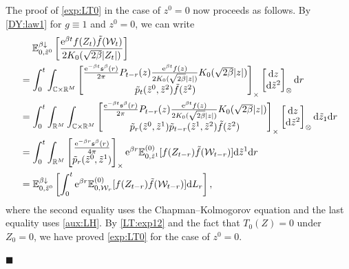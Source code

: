 \documentclass[12pt, twoside]{article}
\numberwithin{figure}{section}
\newcommand{\e}{{\mathrm e}}
\newcommand{\1}{\mathds 1}
\newcommand{\da}{{\downarrow}}
\newcommand{\E}{{\mathbb E}}
\newcommand{\mc}{\mathcal}
\renewcommand{\d}{{\mathrm d}}
\newcommand{\R}{{\Bbb R}}
\newcommand{\2}{{\mathbf 1}}
\newcommand{\s}{{\mathfrak s}}
\renewenvironment{proof}[1][\proofname]{\noindent {\bfseries #1.}\;}{\hfill\ensuremath{\blacksquare}\\}
\begin{document}
\begin{proof}[Proof of Theorem~\ref{thm:formulas}]
The proof of \eqref{exp:LT0} in the case of $z^0=0$ now proceeds as follows. By \eqref{DY:law1} for $g\equiv 1$ and $z^0=0$, we can write
\begin{align}
&\quad\;\E^{\beta\da}_{0,\tilde{z}^0}\left[\frac{\e^{\beta t}f(Z_t)\tilde{f}(\mc W_t)}{2K_0(\sqrt{2\beta}|Z_t|)}\right]\notag\\
&=
\int_0^{t}\int_{\Bbb C\times \R^M}
\begin{bmatrix}
 \frac{\e^{-\beta t}\s^\beta( r)}{2\pi}P_{t- r}(z)\frac{\e^{\beta t}f(z)}{2K_0(\sqrt{2\beta}|z|)}K_0(\sqrt{2\beta}|z|)\\
\vspace{-.4cm}\\
\tilde{p}_t(\tilde{z}^0,\tilde{z}^2)\tilde{f}(\tilde{z}^2)
\end{bmatrix}_\times 
\begin{bmatrix}
\d z\\
\d \tilde{z}^2
\end{bmatrix}_{\otimes}
\d  r\notag\\
&=\int_0^{t}\int_{\R^M}\int_{\Bbb C\times\R^M}
\begin{bmatrix}
 \frac{\e^{-\beta t}\s^\beta( r)}{2\pi}P_{t- r}(z)\frac{\e^{\beta t}f(z)}{2K_0(\sqrt{2\beta}|z|)}K_0(\sqrt{2\beta}|z|)\\
\vspace{-.4cm}\\
\tilde{p}_ r(\tilde{z}^0,\tilde{z}^1)\tilde{p}_{t- r}(\tilde{z}^1,\tilde{z}^2)\tilde{f}(\tilde{z}^2)
\end{bmatrix}_\times 
\begin{bmatrix}
\d z\\
\d \tilde{z}^2
\end{bmatrix}_{\otimes}\d \tilde{z}_1
\d  r\notag\\
&=\int_0^t
\int_{\R^M}\begin{bmatrix}
\frac{\e^{-\beta r}\s^\beta( r)}{4\pi}\\
\vspace{-.4cm}\\
\tilde{p}_{ r}(\tilde{z}^0,\tilde{z}^1)
\end{bmatrix}_{\times}
\e^{\beta r}\E^{(0)}_{0,\tilde{z}^1}[f(Z_{t- r})\tilde{f}(\mathcal W_{t- r})]
\d \tilde{z}^1
\d  r\notag\\
&=\E^{\beta\da }_{0,\tilde{z}^0}\left[\int_0^t\e^{\beta r}\E^{(0)}_{0,\mc W_ r}[f(Z_{t- r})\tilde{f}(\mc W_{t- r})] \d L_ r\right],\label{LT:exp12}
\end{align}
where the second equality uses the Chapman--Kolmogorov equation and the last equality uses \eqref{aux:LH}.  By \eqref{LT:exp12} and the fact that $T_0(Z)=0$ under $Z_0=0$, we have proved \eqref{exp:LT0} for the case of $z^0=0$.


\end{proof}
\end{document}
